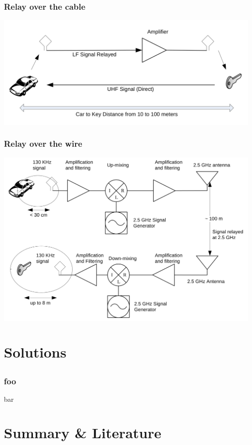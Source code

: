 \documentclass[12pt]{beamer}
\begin{document}
	\begin{frame}
	\frametitle{Relay over the cable}
			\includegraphics[scale=0.85]{img/franc_relay_over_the_wire.png} 
	\end{frame}
	
	\begin{frame}
	\frametitle{Relay over the wire}
			\includegraphics[scale=0.75]{img/franc_relay_over_the_air.png} 
	\end{frame}

\section{Solutions}
\subsection*{}
	\begin{frame}
		\frametitle{foo}
		bar
	\end{frame}

\section{Summary \& Literature}
\end{document}
